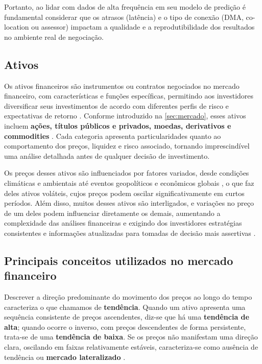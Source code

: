 Portanto, ao lidar com dados de alta frequência em seu modelo de predição é fundamental considerar que os atrasos (latência) e o tipo de conexão (DMA, co-location ou assessor) impactam a qualidade e a reprodutibilidade dos resultados no ambiente real de negociação.




\subsection{Ativos}

Os ativos financeiros são instrumentos ou contratos negociados no mercado financeiro, com características e funções específicas, permitindo aos investidores diversificar seus investimentos de acordo com diferentes perfis de risco e expectativas de retorno \cite{MishkinEakins2018, FabozziModigliani2009}. Conforme introduzido na \autoref{sec:mercado}, esses ativos incluem \textbf{ações, títulos públicos e privados, moedas, derivativos e commodities} \cite{FabozziModigliani2009}. Cada categoria apresenta particularidades quanto ao comportamento dos preços, liquidez e risco associado, tornando imprescindível uma análise detalhada antes de qualquer decisão de investimento. 

Os preços desses ativos são influenciados por fatores variados, desde condições climáticas e ambientais até eventos geopolíticos e econômicos globais \cite{WorldBank2020}, o que faz deles ativos voláteis, cujos preços podem oscilar significativamente em curtos períodos. Além disso, muitos desses ativos são interligados, e variações no preço de um deles podem influenciar diretamente os demais, aumentando a complexidade das análises financeiras e exigindo dos investidores estratégias consistentes e informações atualizadas para tomadas de decisão mais assertivas \cite{MishkinEakins2018}.




\subsection{Principais conceitos utilizados no mercado financeiro}

Descrever a direção predominante do movimento dos preços ao longo do tempo caracteriza o que chamamos de \textbf{tendência}. Quando um ativo apresenta uma sequência consistente de preços ascendentes, diz-se que há uma \textbf{tendência de alta}; quando ocorre o inverso, com preços descendentes de forma persistente, trata-se de uma \textbf{tendência de baixa}. Se os preços não manifestam uma direção clara, oscilando em faixas relativamente estáveis, caracteriza-se como ausência de tendência ou \textbf{mercado lateralizado} \cite{BodieKaneMarcus2021}.

